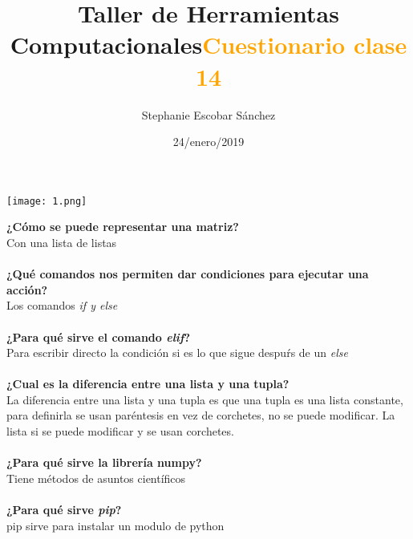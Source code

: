 \documentclass{article}
\title{\Huge Taller de Herramientas Computacionales}
\author{Stephanie Escobar Sánchez}
\date{24/enero/2019}
\begin{document}
	\maketitle
	\begin{center}
		\texttt{[image: 1.png]}	
	\end{center}
	\newpage
	\begin{center}
		\title {\textcolor{orange}{\Huge \textbf{Cuestionario clase 14}} }  
	\end{center}
\textbf{¿Cómo se puede representar una matriz?}\\
Con una lista de listas\\
\\
\textbf{¿Qué comandos nos permiten dar condiciones para ejecutar una acción?}\\
Los comandos \textit{if y else}\\
\\
\textbf{¿Para qué sirve el comando \textit{elif}?}\\
Para escribir directo la condición si es lo que sigue despuŕs de un \textit{else}\\
\\
\textbf{¿Cual es la diferencia entre una lista y una tupla?}\\
La diferencia entre una lista y una tupla es que una tupla es una lista constante, para definirla se usan paréntesis en vez de corchetes, no se puede modificar. La lista si se puede modificar y se usan corchetes.\\
\\
\textbf{¿Para qué sirve la librería numpy?}\\
Tiene métodos de asuntos científicos\\
\\
\textbf{¿Para qué sirve \textit{pip}?}\\
pip sirve para instalar un modulo de python\\
\\
\end{document}
